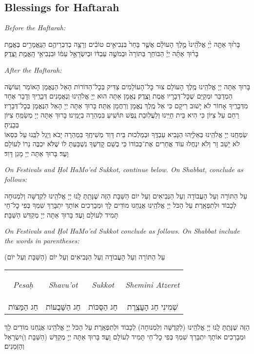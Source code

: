 \documentclass[letterpaper, 12pt]{article}
\newcommand{\englishinst}[1]{
	\begin{minipage}{\textwidth}
		\begin{english}\raggedright\centering
			\textit{#1}
				
				\vspace{2pt}
		\end{english}
	\end{minipage}
}
\newcommand{\eng}[1]{\begin{english}\beginL #1 \endL\end{english}}
\newcommand{\enginline}[1]{
\begin{large}
	\eng{\textit{#1}}
\end{large}
}
\begin{document}
\eng{\section{Blessings for Haftarah}}

\begin{large}
\englishinst{Before the Haftarah:}
בָּר֙וּךְ אַתָּ֤ה יְ֙יָ אֱלֹ֙הֵֽינוּ֙ מֶ֣לֶךְ הָעוֹלָ֔ם אֲשֶׁ֤ר בָּחַר֙ בִּנְבִיאִ֣ים טוֹבִ֔ים וְרָצָ֥ה בְדִבְרֵיהֶ֖ם הַנֶּֽאֱמָרִ֣ים בֶּאֱמֶ֑ת בָּר֨וּךְ אַתָּ֜ה יְיָ֗ הַבּוֹחֵר֚ בַּתּוֹרָה֙ וּבְמֹשֶׁ֣ה עַבְדּ֔וֹ וּבְיִשְׂרָאֵ֣ל עַמּ֔וֹ וּבִנְבִיאֵ֥י הָֽאֱמֶ֖ת וָצֶֽדֶק׃\\

\englishinst{After the Haftarah:}
בָּרוּךְ אַתָּה יְיָ אֱלֹהֵֽינוּ מֶֽלֶךְ הָעוֹלָם צוּר כׇּל־הָעוֹלָמִים צַדִּיק בְּכׇל־הַדּוֹרוֹת הָאֵל הַנֶּאֱמָן הָאוֹמֵר וְעוֹשֶׂה הַמְדַבֵּר וּמְקַיֵּם שֶׁכׇּל־דְּבָרָיו אֱמֶת וָצֶֽדֶק׃ נֶאֱמָן אַתָּה הוּא יְיָ אֱלֹהֵֽינוּ וְנֶאֱמָנִים דְּבָרֶֽיךָ וְדָבָר אֶחָד מִדְּבָרֶֽיךָ אָחוֹר לֹא יָשׁוּב רֵיקָם כִּי אֵל מֶֽלֶךְ נֶאֱמָן וְרַחֲמָן אַֽתָּה׃ בָּרוּךְ אַתָּה יְיָ הָאֵל הַנֶּאֱמָן בְּכׇל־דְּבָרָיו׃\\
רַחֵם עַל צִיּוֹן כִּי הִיא בֵּית חַיֵּֽינוּ וְלַעֲלֽוּבַת נֶֽפֶשׁ תּוֹשִֽׁיעַ בִּמְהֵרָה בְיָמֵֽינוּ׃ בָּרוּךְ אַתָּה יְיָ מְשַׂמֵּֽחַ צִיּוֹן בְּבָנֶֽיהָ׃\\
שַׂמְּחֵֽנוּ יְיָ אֱלֹהֵֽינוּ בְּאֵלִיָּֽהוּ הַנָּבִיא עַבְדֶּֽךָ וּבְמַלְכוּת בֵּית דָּוִד מְשִׁיחֶֽךָ בִּמְהֵרָה יָבֹא וְיָגֵל לִבֵּֽנוּ עַל כִּסְאוֹ לֹא יֵשֵׁב זָר וְלֹא יִנְחֲלוּ עוֹד אֲחֵרִים אֶת־כְּבוֹדוֹ כִּי בְשֵׁם קׇדְשְׁךָ נִשְׁבַּעְתָּ לוֹ שֶׁלֹּא יִכְבֶּה נֵרוֹ לְעוֹלָם וָעֶד׃ בָּרוּךְ אַתָּה יְיָ מָגֵן דָּוִד׃


\englishinst{On Festivals and \d{H}ol HaMo'ed Sukkot, continue below.  On Shabbat, conclude as follows:}
עַל הַתּוֹרָה וְעַל הָעֲבוֹדָה וְעַל הַנְּבִיאִים וְעַל יוֹם הַשַּׁבָּת הַזֶּה שֶׁנָּתַֽתָּ לָֽנוּ יְיָ אֱלֹהֵֽינוּ לִקְדֻשָּׁה וְלִמְנוּחָה לְכָבוֹד וּלְתִפְאָֽרֶת׃ עַל הַכֹּל יְיָ אֱלֹהֵֽינוּ אֲנַֽחְנוּ מוֹדִים לָךְ וּמְבָרְכִים אוֹתָךְ יִתְבָּרַךְ שִׁמְךָ בְּפִי כׇל־חַי תָּמִיד לְעוֹלָם וָעֶד׃ בָּרוּךְ אַתָּה יְיָ מְקַדֵּשׁ הַשַּׁבָּת׃\\

\englishinst{On Festivals and \d{H}ol HaMo'ed Sukkot conclude as follows. On Shabbat include the words in parentheses:}
עַל הַתּוֹרָה וְעַל הָעֲבוֹדָה וְעַל הַנְּבִיאִים וְעַל יוֹם (הַשַּׁבָּת וְעַל יוֹם)\\
	
\begin{tabular}{c | c | c | c}

\enginline{Pesa\d{h}}&\enginline{Shavu'ot}&\enginline{Sukkot}&\enginline{Shemini Atzeret}\\	
			חַג הַמַּצּוֹת & חַג הַשָּׁבֻעוֹת & חַג הַסֻּכּוֹת & שְׁמִינִי חַג הָעֲצֶֽרֶת\\ 
\end{tabular}

	הַזֶּה שֶׁנָּתַֽתָּ לָֽנוּ יְיָ אֱלֹהֵֽינוּ (לִקְדֻשָּׁה וְלִמְנוּחָה) לְכָבוֹד וּלְתִפְאָֽרֶת׃ עַל הַכֹּל יְיָ אֱלֹהֵֽינוּ אֲנַֽחְנוּ מוֹדִים לָךְ וּמְבָרְכִים אוֹתָךְ יִתְבָּרַךְ שִׁמְךָ בְּפִי כׇל־חַי תָּמִיד לְעוֹלָם וָעֶד׃ בָּרוּךְ אַתָּה יְיָ מְקַדֵּשׁ (הַשַּׁבָּת וְ)יִשְׂרָאֵל וְהַזְּמַנִים׃
\end{large}
\end{document}
